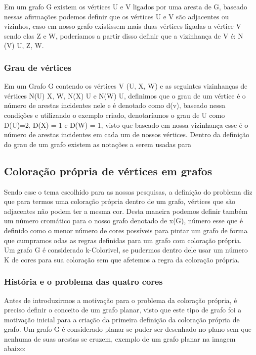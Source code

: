 \documentclass[12pt]{article}
\begin{document}
   	Em um grafo G existem os vértices U e V ligados por uma aresta de G, baseado nessas afirmações podemos definir que os vértices U e V são adjacentes ou vizinhos, caso em nosso grafo existissem mais duas vértices ligadas a vértice V sendo elas Z e W, poderíamos a partir disso definir que a vizinhança de V é: N (V) {U, Z, W}. 
   	
   	\subsubsection{Grau de vértices}
    Em um Grafo G contendo os vértices V (U, X, W) e as seguintes vizinhanças de vértices N(U) {X, W}, N(X) {U} e N(W) {U}, definimos que o grau de um vértice é o número de arestas incidentes nele e é denotado como d(v), baseado nessa condições e utilizando o exemplo criado, denotaríamos o grau de U como D(U)=2, D(X) = 1 e D(W) = 1, visto que baseado em nossa vizinhança esse é o número de arestas incidentes em cada um de nossos vértices.
    Dentro da definição do grau de um grafo existem as notações a serem usadas para 
    
    \subsection{ Coloração própria de vértices em grafos}
    Sendo esse o tema escolhido para as nossas pesquisas, a definição do problema diz que para termos uma coloração própria dentro de um grafo, vértices que são adjacentes não podem ter a mesma cor. Desta maneira podemos definir também um número cromático para o nosso grafo denotado de x(G), número esse que é definido como o menor número de cores possíveis para pintar um grafo de forma que cumpramos odas as regras definidas para um grafo com coloração própria.
    Um grafo G é considerado k-Colorivel, se pudermos dentro dele usar um número K de cores para sua coloração sem que afetemos a regra da coloração própria.
    
    \subsubsection{História e o problema das quatro cores}
    
    Antes de introduzirmos a motivação para o problema da coloração própria, é preciso definir o conceito de um grafo planar, visto que este tipo de grafo foi a motivação inicial para a criação da primeira definição da coloração própria de grafo.
    Um grafo G é considerado planar se puder ser desenhado no plano sem que nenhuma de suas arestas se cruzem, exemplo de um grafo planar na imagem abaixo:
    
\end{document}
